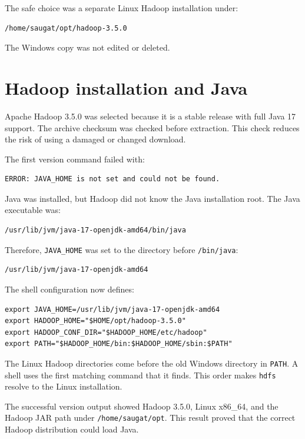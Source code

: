 \documentclass[11pt,a4paper]{article}
\begin{document}
The safe choice was a separate Linux Hadoop installation under:

\begin{lstlisting}
/home/saugat/opt/hadoop-3.5.0
\end{lstlisting}

The Windows copy was not edited or deleted.

\section{Hadoop installation and Java}

Apache Hadoop 3.5.0 was selected because it is a stable release with full Java 17 support. The archive checksum was checked before extraction. This check reduces the risk of using a damaged or changed download.

The first version command failed with:

\begin{lstlisting}
ERROR: JAVA_HOME is not set and could not be found.
\end{lstlisting}

Java was installed, but Hadoop did not know the Java installation root. The Java executable was:

\begin{lstlisting}
/usr/lib/jvm/java-17-openjdk-amd64/bin/java
\end{lstlisting}

Therefore, \texttt{JAVA\_HOME} was set to the directory before \texttt{/bin/java}:

\begin{lstlisting}
/usr/lib/jvm/java-17-openjdk-amd64
\end{lstlisting}

The shell configuration now defines:

\begin{lstlisting}
export JAVA_HOME=/usr/lib/jvm/java-17-openjdk-amd64
export HADOOP_HOME="$HOME/opt/hadoop-3.5.0"
export HADOOP_CONF_DIR="$HADOOP_HOME/etc/hadoop"
export PATH="$HADOOP_HOME/bin:$HADOOP_HOME/sbin:$PATH"
\end{lstlisting}

The Linux Hadoop directories come before the old Windows directory in \texttt{PATH}. A shell uses the first matching command that it finds. This order makes \texttt{hdfs} resolve to the Linux installation.

The successful version output showed Hadoop 3.5.0, Linux x86\_64, and the Hadoop JAR path under \texttt{/home/saugat/opt}. This result proved that the correct Hadoop distribution could load Java.
\end{document}
